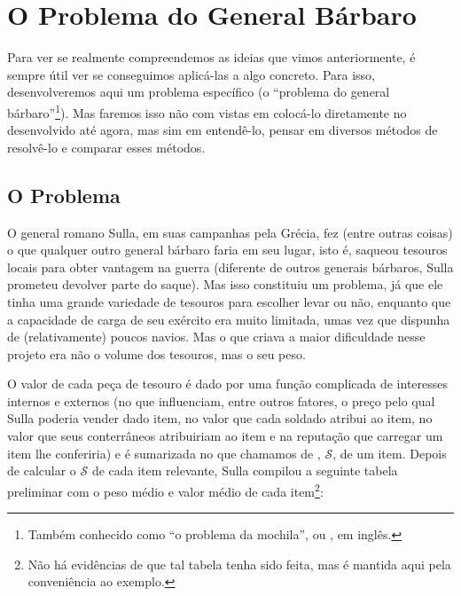 
%


%

\section{O Problema do General Bárbaro}

Para ver se realmente compreendemos as ideias que vimos
anteriormente, é sempre útil ver se conseguimos aplicá-las a algo
concreto. Para isso, desenvolveremos aqui um problema específico (o
``problema do general bárbaro''\footnote{Também conhecido como ``o
  problema da mochila'', ou , em
  inglês.}). Mas faremos isso não com vistas em colocá-lo
diretamente no  desenvolvido até agora, mas sim
em entendê-lo, pensar em diversos métodos de resolvê-lo e comparar
esses métodos.

\subsection{O Problema}

O general romano Sulla, em suas campanhas pela Grécia, fez (entre
outras coisas) o que qualquer outro general bárbaro faria em seu
lugar, isto é, saqueou tesouros locais para obter vantagem na guerra
(diferente de outros generais bárbaros, Sulla prometeu devolver parte
do saque). Mas isso constituiu um problema, já que ele tinha uma
grande variedade de tesouros para escolher levar ou não, enquanto que
a capacidade de carga de seu exército era muito limitada, umas vez que
dispunha de (relativamente) poucos navios. Mas o que criava a maior
dificuldade nesse projeto era não o volume dos tesouros, mas o seu
peso.

O valor de cada peça de tesouro é dado por uma função complicada de
interesses internos e externos (no que influenciam, entre outros
fatores, o preço pelo qual Sulla poderia vender dado item, no valor
que cada soldado atribui ao item, no valor que seus conterrâneos
atribuiriam ao item e na reputação que carregar um item lhe
conferiria) e é sumarizada no que chamamos de ,
$\mathscr{S}$, de um item. Depois de calcular o $\mathscr{S}$ de cada
item relevante, Sulla compilou a seguinte tabela preliminar com o peso
médio e valor médio de cada item\footnote{Não há evidências de que tal
  tabela tenha sido feita, mas é mantida aqui pela conveniência ao
  exemplo.}:


